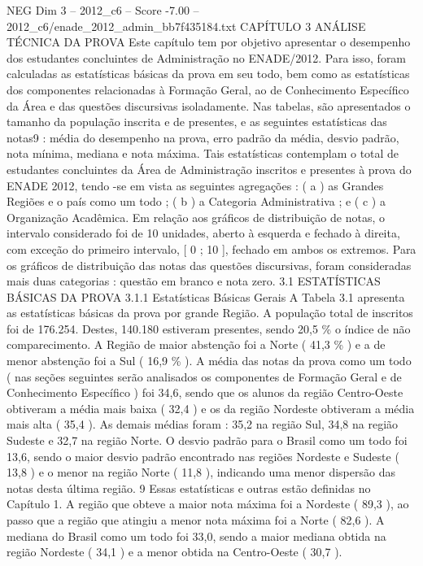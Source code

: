 \begin{textsample}{NEG Dim 3 – 2012\_c6 – Score -7.00 – 2012\_c6/enade\_2012\_admin\_bb7f435184.txt}  \label{ex:f3_neg_022}
CAPÍTULO 3 ANÁLISE TÉCNICA DA PROVA Este capítulo tem por objetivo apresentar o desempenho dos estudantes concluintes de Administração no ENADE/2012.
Para isso, foram calculadas as estatísticas básicas da prova em seu todo, bem como as estatísticas dos componentes relacionadas à Formação Geral, ao de Conhecimento Específico da Área e das questões discursivas isoladamente.
Nas tabelas, são apresentados o tamanho da população inscrita e de presentes, e as seguintes estatísticas das notas9 : média do desempenho na prova, erro padrão da média, desvio padrão, nota mínima, mediana e nota máxima.
Tais estatísticas contemplam o total de estudantes concluintes da Área de Administração inscritos e presentes à prova do ENADE 2012, tendo -se em vista as seguintes agregações : ( a ) as Grandes Regiões e o país como um todo ; ( b ) a Categoria Administrativa ; e ( c ) a Organização Acadêmica.
Em relação aos gráficos de distribuição de notas, o intervalo considerado foi de 10 unidades, aberto à esquerda e fechado à direita, com exceção do primeiro intervalo, [ 0 ; 10 ], fechado em ambos os extremos.
Para os gráficos de distribuição das notas das questões discursivas, foram consideradas mais duas categorias : questão em branco e nota zero. 3.1 ESTATÍSTICAS BÁSICAS DA PROVA 3.1.1 Estatísticas Básicas Gerais A Tabela 3.1 apresenta as estatísticas básicas da prova por grande Região.
A população total de inscritos foi de 176.254.
Destes, 140.180 estiveram presentes, sendo 20,5 \% o índice de não comparecimento.
A Região de maior abstenção foi a Norte ( 41,3 \% ) e a de menor abstenção foi a Sul ( 16,9 \% ).
A média das notas da prova como um todo ( nas seções seguintes serão analisados os componentes de Formação Geral e de Conhecimento Específico ) foi 34,6, sendo que os alunos da região Centro-Oeste obtiveram a média mais baixa ( 32,4 ) e os da região Nordeste obtiveram a média mais alta ( 35,4 ).
As demais médias foram : 35,2 na região Sul, 34,8 na região Sudeste e 32,7 na região Norte.
O desvio padrão para o Brasil como um todo foi 13,6, sendo o maior desvio padrão encontrado nas regiões Nordeste e Sudeste ( 13,8 ) e o menor na região Norte ( 11,8 ), indicando uma menor dispersão das notas desta última região. 9 Essas estatísticas e outras estão definidas no Capítulo 1.
A região que obteve a maior nota máxima foi a Nordeste ( 89,3 ), ao passo que a região que atingiu a menor nota máxima foi a Norte ( 82,6 ).
A mediana do Brasil como um todo foi 33,0, sendo a maior mediana obtida na região Nordeste ( 34,1 ) e a menor obtida na Centro-Oeste ( 30,7 ).

\end{textsample}
